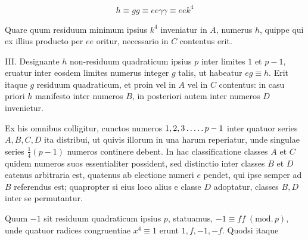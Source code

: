 \[
h\equiv gg\equiv ee\gamma\gamma\equiv eek^4
\]

Quare quum residuum minimum ipsius $k^4$ inveniatur in $A$, numerus $h$, quippe qui ex illius producto per $ee$ oritur, necessario in $C$ contentus erit.

III. Designante $h$ non-residuum quadraticum ipsius $p$ inter limites $1$ et $p-1$, eruatur inter eosdem limites numerus integer $g$ talis, ut habeatur $eg\equiv h$. Erit itaque $g$ residuum quadraticum, et proin vel in $A$ vel in $C$ contentus: in casu priori $h$ manifesto inter numeros $B$, in posteriori autem inter numeros $D$ invenietur.

Ex his omnibus colligitur, cunctos numeros $1,2,3\mathinner{.\,.\,.\,.\,.} p-1$ inter quatuor series $A,B,C,D$ ita distribui, ut quivis illorum in una harum reperiatur, unde singulae series $\tfrac14(p-1)$ numeros continere debent. In hac classificatione classes $A$ et $C$ quidem numeros suos essentialiter possident, sed distinctio inter classes $B$ et $D$ eatenus arbitraria est, quatenus ab electione numeri $e$ pendet, qui ipse semper ad $B$ referendus est; quapropter si eius loco alius e classe $D$ adoptatur, classes $B,D$ inter se permutantur.

Quum $-1$ sit residuum quadraticum ipsius $p$, statuamus, $-1\equiv ff\; (\mathrm{mod.}\,p)$, unde quatuor radices congruentiae $x^4\equiv1$ erunt $1,f,-1,-f$. Quodsi itaque\space%
